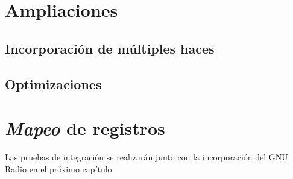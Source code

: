 \documentclass[../../main.tex]{subfiles}
\begin{document}
\section{Ampliaciones}
\subsection{Incorporación de múltiples haces}
\subsection{Optimizaciones}

\section{\textit{Mapeo} de registros}

Las pruebas de integración se realizarán junto con la incorporación del GNU Radio en el próximo capítulo.
\end{document}

